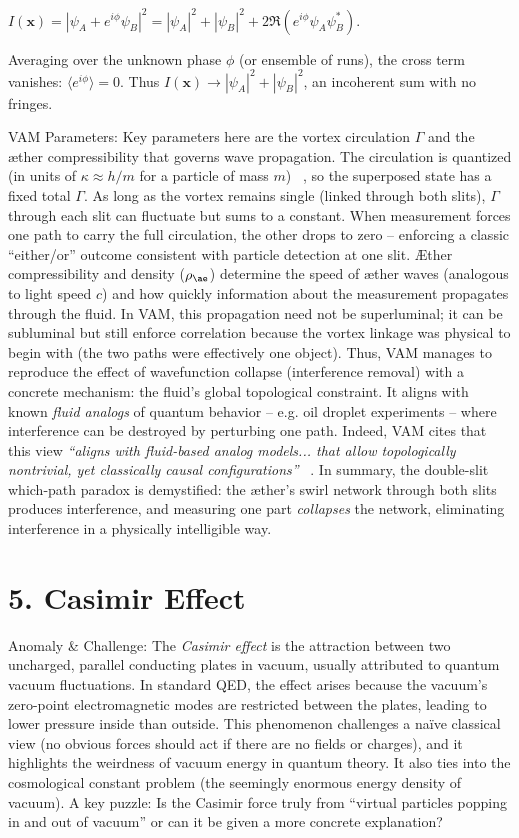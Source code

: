 \documentclass[a4paper, aps,preprint,superscriptaddress, 12pt]{revtex4}
\begin{document}
$I(\mathbf{x}) = |\psi_A + e^{i\phi}\psi_B|^2 = |\psi_A|^2 + |\psi_B|^2 + 2\Re(e^{i\phi}\psi_A \psi_B^*).$

Averaging over the unknown phase $\phi$ (or ensemble of runs), the cross term vanishes: $\langle e^{i\phi}\rangle = 0$. Thus $I(\mathbf{x}) \to |\psi_A|^2 + |\psi_B|^2$, an incoherent sum with no fringes.


VAM Parameters: Key parameters here are the vortex circulation $\Gamma$ and the æther compressibility that governs wave propagation. The circulation is quantized (in units of $\kappa \approx h/m$ for a particle of mass $m$)~\cite{Iskandarani2025c} , so the superposed state has a fixed total $\Gamma$. As long as the vortex remains single (linked through both slits), $\Gamma$ through each slit can fluctuate but sums to a constant. When measurement forces one path to carry the full circulation, the other drops to zero – enforcing a classic “either/or” outcome consistent with particle detection at one slit. Æther compressibility and density ($\rho_{\ae}$) determine the speed of æther waves (analogous to light speed $c$) and how quickly information about the measurement propagates through the fluid. In VAM, this propagation need not be superluminal; it can be subluminal but still enforce correlation because the vortex linkage was physical to begin with (the two paths were effectively one object). Thus, VAM manages to reproduce the effect of wavefunction collapse (interference removal) with a concrete mechanism: the fluid’s global topological constraint. It aligns with known \textit{fluid analogs} of quantum behavior – e.g. oil droplet experiments – where interference can be destroyed by perturbing one path. Indeed, VAM cites that this view \textit{“aligns with fluid-based analog models... that allow topologically nontrivial, yet classically causal configurations”}~\cite{Iskandarani2025c} . In summary, the double-slit which-path paradox is demystified: the æther’s swirl network through both slits produces interference, and measuring one part \textit{collapses} the network, eliminating interference in a physically intelligible way.


\section*{5. Casimir Effect}

Anomaly \& Challenge: The \textit{Casimir effect} is the attraction between two uncharged, parallel conducting plates in vacuum, usually attributed to quantum vacuum fluctuations. In standard QED, the effect arises because the vacuum’s zero-point electromagnetic modes are restricted between the plates, leading to lower pressure inside than outside. This phenomenon challenges a naïve classical view (no obvious forces should act if there are no fields or charges), and it highlights the weirdness of vacuum energy in quantum theory. It also ties into the cosmological constant problem (the seemingly enormous energy density of vacuum). A key puzzle: Is the Casimir force truly from “virtual particles popping in and out of vacuum” or can it be given a more concrete explanation?
\end{document}
